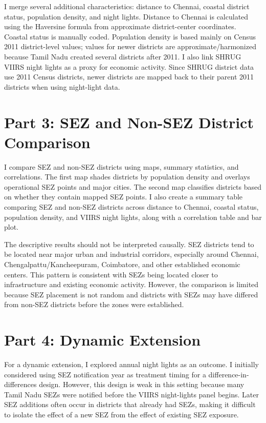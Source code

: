 \documentclass[10.5pt]{article}
\begin{document}
I merge several additional characteristics: distance to Chennai, coastal district status, population density, and night lights. Distance to Chennai is calculated using the Haversine formula from approximate district-center coordinates. Coastal status is manually coded. Population density is based mainly on Census 2011 district-level values; values for newer districts are approximate/harmonized because Tamil Nadu created several districts after 2011. I also link SHRUG VIIRS night lights as a proxy for economic activity. Since SHRUG district data use 2011 Census districts, newer districts are mapped back to their parent 2011 districts when using night-light data.

\section*{Part 3: SEZ and Non-SEZ District Comparison}

I compare SEZ and non-SEZ districts using maps, summary statistics, and correlations. The first map shades districts by population density and overlays operational SEZ points and major cities. The second map classifies districts based on whether they contain mapped SEZ points. I also create a summary table comparing SEZ and non-SEZ districts across distance to Chennai, coastal status, population density, and VIIRS night lights, along with a correlation table and bar plot.

The descriptive results should not be interpreted causally. SEZ districts tend to be located near major urban and industrial corridors, especially around Chennai, Chengalpattu/Kancheepuram, Coimbatore, and other established economic centers. This pattern is consistent with SEZs being located closer to infrastructure and existing economic activity. However, the comparison is limited because SEZ placement is not random and districts with SEZs may have differed from non-SEZ districts before the zones were established.

\section*{Part 4: Dynamic Extension}

For a dynamic extension, I explored annual night lights as an outcome. I initially considered using SEZ notification year as treatment timing for a difference-in-differences design. However, this design is weak in this setting because many Tamil Nadu SEZs were notified before the VIIRS night-lights panel begins. Later SEZ additions often occur in districts that already had SEZs, making it difficult to isolate the effect of a new SEZ from the effect of existing SEZ exposure.
\end{document}
